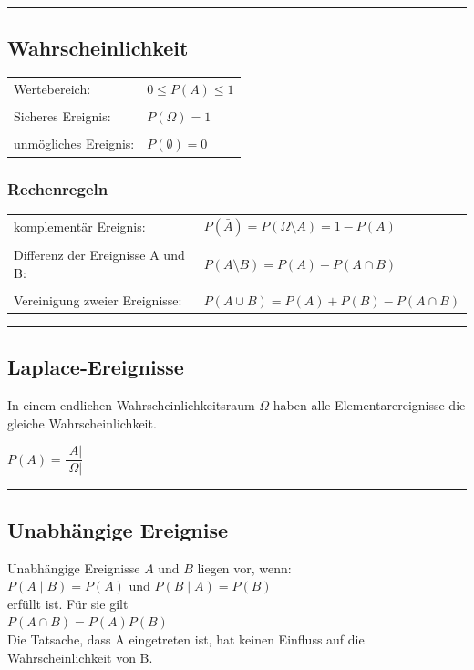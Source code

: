 \hrule
\vspace{5mm}
	\begin{minipage}{6.8cm}
	\subsection{Wahrscheinlichkeit}
		\begin{tabular}{ll}
			Wertebereich:
			& ${0}\le{P(A)}\le{1}$\\ \\
			Sicheres Ereignis:
			& $P(\Omega)=1$\\ \\
			unmögliches Ereignis:
			& $P(\emptyset)=0$
		\end{tabular}
	\end{minipage}
		\begin{minipage}{11.2cm}
		\subsubsection{Rechenregeln}
			\begin{tabular}{ll}
				komplementär Ereignis:
				&$P(\bar{A})=P({\Omega}\setminus{A})=1-P(A)$\\ \\
				Differenz der Ereignisse A und B:
				&$P({A}\setminus{B})=P(A)-P({A}\cap{B})$\\ \\
				Vereinigung zweier Ereignisse:
				&$P({A}\cup{B})=P(A)+P(B)-P({A}\cap{B})$
			\end{tabular}
		\end{minipage}
\vspace{1mm}
\hrule
	
	\subsection{Laplace-Ereignisse  }
    	In einem endlichen Wahrscheinlichkeitsraum $\Omega$ haben alle
    	Elementarereignisse die gleiche Wahrscheinlichkeit.
    	\begin{center}
    	$P(A)=\dfrac{\left| A\right|}{\left|\Omega\right|}$
    	\end{center}


\hrule

	\subsection{Unabhängige Ereignise  }
		Unabhängige Ereignisse $A$ und $B$ liegen vor, wenn:\\
    	\hspace*{8mm} $P(A\mid B)=P(A)$ \hspace{4mm} und \hspace{4mm}
    	$P(B\mid A)=P(B)$\\
    	erfüllt ist. Für sie gilt\\
    	\hspace*{8mm} $P(A\cap B)=P(A)P(B)$\\
    	Die Tatsache, dass A eingetreten ist, hat keinen Einfluss auf die 
		Wahrscheinlichkeit von B.\vspace{1mm}

